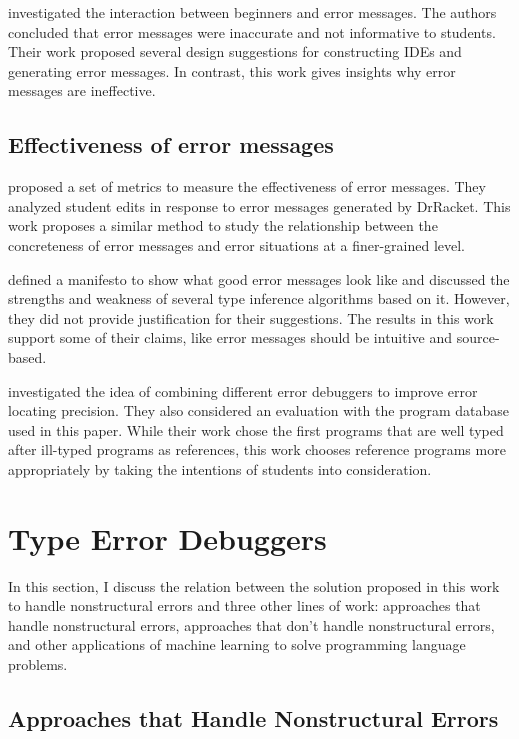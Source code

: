 \documentclass[12pt]{report}	%
\begin{document}
\cite{marceau2011mind} investigated the interaction between
beginners and error messages.
The authors concluded that error messages were
inaccurate and not informative to students.
Their work proposed several design
suggestions for constructing IDEs and generating
error messages.
In contrast, this work gives insights
why error messages are ineffective.

\subsection{Effectiveness of error messages}

\cite{marceau2011measuring} proposed a set of metrics to
measure the effectiveness of
error messages.
They analyzed student edits
in response to error messages generated by DrRacket.
This work proposes a similar method to study
the relationship between
the concreteness of error messages and
error situations at a finer-grained level.

\cite{yang2000improved} defined a manifesto to show
what good error messages look like and discussed
the strengths and weakness of several type inference
algorithms based on it.
However, they did not provide justification
for their suggestions.
The results in this work support some of their claims,
like error messages
should be intuitive and source-based.

\cite{chen2014let} investigated the idea
of combining different error debuggers to improve
error locating precision. They also considered
an evaluation with the program database used
in this paper. While their work
chose the first programs that are well typed after
ill-typed programs as references, this work chooses
reference programs more appropriately by taking the
intentions of students into consideration.

\section{Type Error Debuggers}
\label{sec:reivew:debugger}

In this section, I discuss the relation between the solution proposed in this work to handle nonstructural errors and
three other lines of work: approaches that handle nonstructural errors, approaches that don't handle nonstructural errors,
and other applications of machine learning to solve programming language problems.

\subsection{Approaches that Handle Nonstructural Errors}
\end{document}
